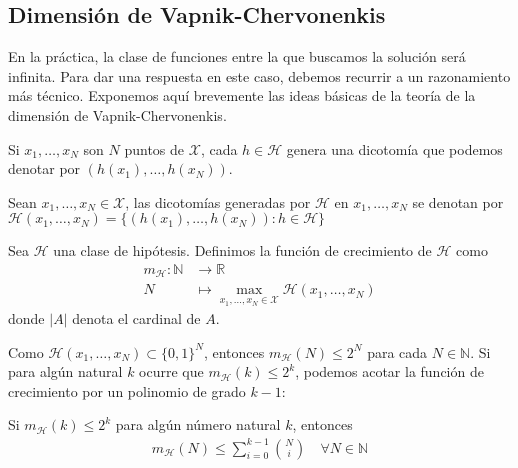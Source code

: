 \subsection{Dimensión de Vapnik-Chervonenkis}
En la práctica, la clase de funciones entre la que buscamos la solución será infinita. Para dar una respuesta en este caso, debemos recurrir a un razonamiento más técnico. Exponemos aquí brevemente las ideas básicas de la teoría de la dimensión de Vapnik-Chervonenkis. 

Si $x_1, \ldots, x_N$ son $N$ puntos de $\mathcal{X}$, cada $h \in \mathcal{H}$ genera una dicotomía que podemos denotar por $(h(x_1), \ldots, h(x_N))$.
\begin{definition}
	Sean $x_1, \ldots, x_N \in \mathcal{X}$, las dicotomías generadas por $\mathcal{H}$ en $x_1, \ldots, x_N$ se denotan por $\mathcal{H}(x_1, \ldots, x_N) = \{ (h(x_1), \ldots, h(x_N)) \colon h \in \mathcal{H} \} $
\end{definition}

\begin{definition}
	Sea $\mathcal{H}$ una clase de hipótesis. Definimos la función de crecimiento de $\mathcal{H}$ como 
	\begin{align*}
		m_{\mathcal{H}} \colon \mathbb{N} &\to \mathbb{R}\\
		N &\mapsto \max_{x_1, \ldots, x_N \in \mathcal{X}}  \mathcal{H}(x_1, \ldots, x_N)
	\end{align*}
	donde $|A|$ denota el cardinal de $A$.
\end{definition}

Como  $\mathcal{H}(x_1, \ldots, x_N) \subset \{ 0, 1 \}^N$, entonces $m_{\mathcal{H}}(N) \leq 2^N$ para cada $N \in \mathbb{N}$. Si para algún natural $k$ ocurre que $m_{\mathcal{H}}(k) \leq 2^k$, podemos acotar la función de crecimiento por un polinomio de grado $k-1$:

\begin{prop}
	Si $m_{\mathcal{H}}(k) \leq 2^k$ para algún número natural $k$, entonces 
	\begin{align*}
		m_{\mathcal{H}}(N) \leq \sum_{i=0}^{k-1} \binom{N}{i} \quad \forall N \in \mathbb{N}
	\end{align*}
\end{prop}


